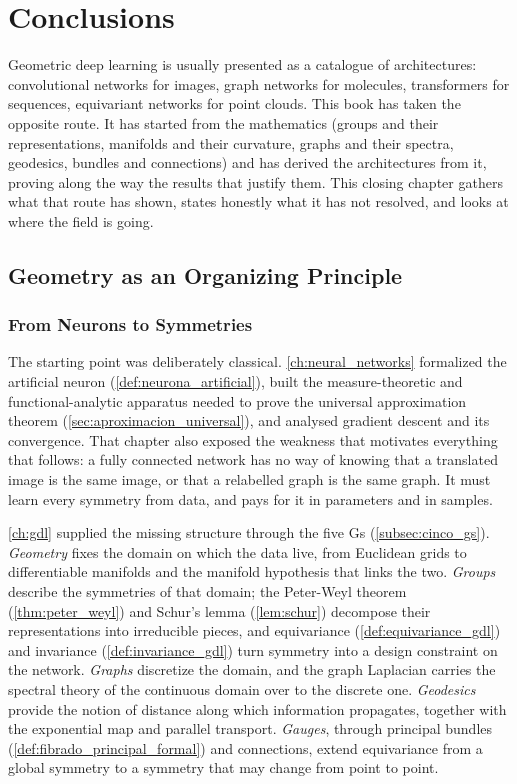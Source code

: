 \chapter{Conclusions}\label{ch:conclusions}

Geometric deep learning is usually presented as a catalogue of architectures: convolutional networks for images, graph networks for molecules, transformers for sequences, equivariant networks for point clouds. This book has taken the opposite route. It has started from the mathematics (groups and their representations, manifolds and their curvature, graphs and their spectra, geodesics, bundles and connections) and has derived the architectures from it, proving along the way the results that justify them. This closing chapter gathers what that route has shown, states honestly what it has not resolved, and looks at where the field is going.


\section{Geometry as an Organizing Principle}

\subsection{From Neurons to Symmetries}

The starting point was deliberately classical. \autoref{ch:neural_networks} formalized the artificial neuron (\autoref{def:neurona_artificial}), built the measure-theoretic and functional-analytic apparatus needed to prove the universal approximation theorem (\autoref{sec:aproximacion_universal}), and analysed gradient descent and its convergence. That chapter also exposed the weakness that motivates everything that follows: a fully connected network has no way of knowing that a translated image is the same image, or that a relabelled graph is the same graph. It must learn every symmetry from data, and pays for it in parameters and in samples.

\autoref{ch:gdl} supplied the missing structure through the five Gs (\autoref{subsec:cinco_gs}). \emph{Geometry} fixes the domain on which the data live, from Euclidean grids to differentiable manifolds and the manifold hypothesis that links the two. \emph{Groups} describe the symmetries of that domain; the Peter-Weyl theorem (\autoref{thm:peter_weyl}) and Schur's lemma (\autoref{lem:schur}) decompose their representations into irreducible pieces, and equivariance (\autoref{def:equivariance_gdl}) and invariance (\autoref{def:invariance_gdl}) turn symmetry into a design constraint on the network. \emph{Graphs} discretize the domain, and the graph Laplacian carries the spectral theory of the continuous domain over to the discrete one. \emph{Geodesics} provide the notion of distance along which information propagates, together with the exponential map and parallel transport. \emph{Gauges}, through principal bundles (\autoref{def:fibrado_principal_formal}) and connections, extend equivariance from a global symmetry to a symmetry that may change from point to point.

